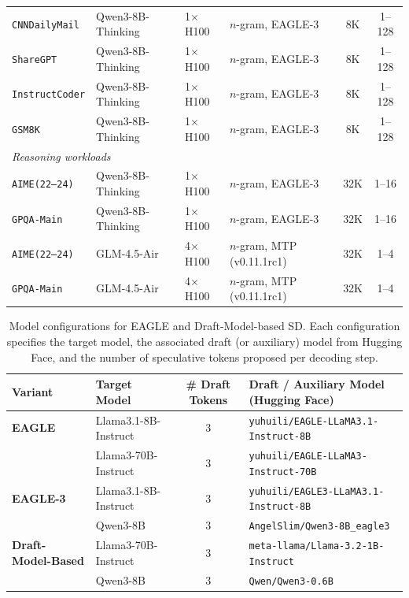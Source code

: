 \documentclass{article}
\begin{document}
\begin{table}[t!]
\begin{tabular}{l l l l c c}
\texttt{CNNDailyMail} & Qwen3-8B-Thinking    & 1$\times$H100 & $n$-gram, EAGLE-3         & 8K  & 1–128 \\
\texttt{ShareGPT}     & Qwen3-8B-Thinking    & 1$\times$H100 & $n$-gram, EAGLE-3      & 8K  & 1–128 \\
\texttt{InstructCoder}& Qwen3-8B-Thinking    & 1$\times$H100 & $n$-gram, EAGLE-3    & 8K  & 1–128 \\
\texttt{GSM8K}        & Qwen3-8B-Thinking    & 1$\times$H100 & $n$-gram, EAGLE-3    & 8K  & 1–128 \\
\midrule
\multicolumn{6}{l}{\textit{Reasoning workloads}} \\
\texttt{AIME(22--24)} & Qwen3-8B-Thinking    & 1$\times$H100 & $n$-gram, EAGLE-3       & 32K & 1–16 \\
\texttt{GPQA-Main}    & Qwen3-8B-Thinking    & 1$\times$H100 & $n$-gram, EAGLE-3       & 32K & 1–16 \\
\texttt{AIME(22--24)} & GLM-4.5-Air    & 4$\times$H100 & $n$-gram, MTP (v0.11.1rc1)       & 32K & 1–4 \\
\texttt{GPQA-Main}    & GLM-4.5-Air     & 4$\times$H100 & $n$-gram, MTP (v0.11.1rc1)      & 32K & 1–4 \\
\bottomrule
\end{tabular}
\end{table}

\begin{table}[t]
\centering
\caption{
Model configurations for EAGLE and Draft-Model-based SD.
Each configuration specifies the target model, the associated draft (or auxiliary) model from Hugging Face,
and the number of speculative tokens proposed per decoding step.}
\label{appendix:model-config}
\begin{tabular}{l l c l}
\toprule
\textbf{Variant} & \textbf{Target Model} & \textbf{\# Draft Tokens} & \textbf{Draft / Auxiliary Model (Hugging Face)} \\
\midrule
\textbf{EAGLE} 
& Llama3.1-8B-Instruct & 3 & \texttt{yuhuili/EAGLE-LLaMA3.1-Instruct-8B} \\
& Llama3-70B-Instruct  & 3 & \texttt{yuhuili/EAGLE-LLaMA3-Instruct-70B} \\
\midrule
\textbf{EAGLE-3} 
& Llama3.1-8B-Instruct & 3 & \texttt{yuhuili/EAGLE3-LLaMA3.1-Instruct-8B} \\
& Qwen3-8B             & 3 & \texttt{AngelSlim/Qwen3-8B\_eagle3} \\
\midrule
\textbf{Draft-Model-Based} 
& Llama3-70B-Instruct  & 3 & \texttt{meta-llama/Llama-3.2-1B-Instruct} \\
& Qwen3-8B             & 3 & \texttt{Qwen/Qwen3-0.6B} \\
\bottomrule
\end{tabular}
\end{table}
\pagebreak
\end{document}
